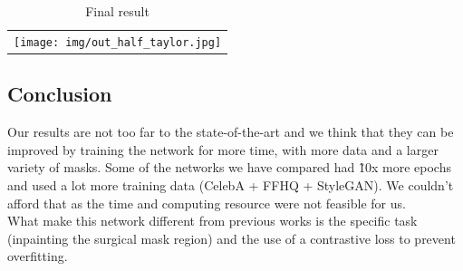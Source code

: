 \documentclass[10pt,twocolumn,letterpaper]{article}
\begin{document}
\begin{table}
  \begin{tabular}{c}
    \texttt{[image: img/out\_half\_taylor.jpg]}
  \end{tabular}
    \caption{Final result}
    \label{fig:recon_ref_taylor}
\end{table}

\subsection{Conclusion}
Our results are not too far to the state-of-the-art and we think that they can
be improved by training the network for more time, with more data and a larger
variety of masks. Some of the networks we have compared had \~10x more epochs
and used a lot more training data (CelebA + FFHQ + StyleGAN). We couldn't afford
that as the time and computing resource were not feasible for us.\\
What make this network different from previous works is the specific task
(inpainting the surgical mask region) and the use of a contrastive loss to
prevent overfitting.

{\small


}
\end{document}
